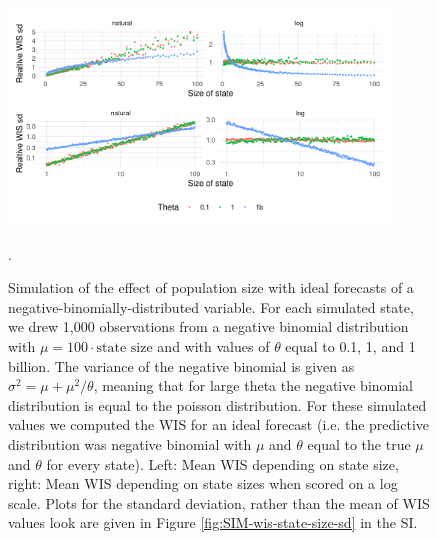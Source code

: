 \documentclass{article}
\begin{document}
\begin{figure}[h!]
    \centering
    \includegraphics[width=0.9\textwidth]{output/figures/SIM-sd-state-size.png}
    \caption{Simulation of the effect of population size with ideal forecasts of a negative-binomially-distributed variable. For each simulated state, we drew 1,000 observations from a negative binomial distribution with $\mu = 100 \cdot \text{state size}$ and with values of $\theta$ equal to 0.1, 1, and 1 billion. The variance of the negative binomial is given as $\sigma^2 = \mu + \mu^2 / \theta$, meaning that for large theta the negative binomial distribution is equal to the poisson distribution. For these simulated values we computed the WIS for an ideal forecast (i.e. the predictive distribution was negative binomial with $\mu$ and $\theta$ equal to the true $\mu$ and $\theta$ for every state). Left: Mean WIS depending on state size, right: Mean WIS depending on state sizes when scored on a log scale. Plots for the standard deviation, rather than the mean of WIS values look are given in Figure \ref{fig:SIM-wis-state-size-sd} in the SI.}. 
    \label{fig:SIM-wis-state-size-mean}
\end{figure}
\end{document}
